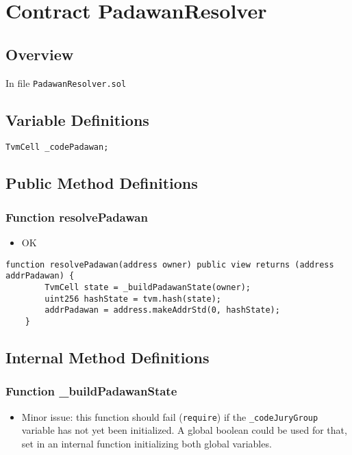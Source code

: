 
\chapter{Contract PadawanResolver}

\minitoc

\section{Overview}


In file {\tt PadawanResolver.sol}

\section{Variable Definitions}

\begin{lstlisting}[firstnumber=8]
    TvmCell _codePadawan;
\end{lstlisting}

\section{Public Method Definitions}

\subsection{Function resolvePadawan}

\begin{itemize}
\item OK
\end{itemize}

\begin{lstlisting}[firstnumber=10]
    function resolvePadawan(address owner) public view returns (address addrPadawan) {
        TvmCell state = _buildPadawanState(owner);
        uint256 hashState = tvm.hash(state);
        addrPadawan = address.makeAddrStd(0, hashState);
    }
\end{lstlisting}

\section{Internal Method Definitions}


\subsection{Function \_{}buildPadawanState}

\begin{itemize}
\item Minor issue: this function should fail ({\tt require}) if the
  {\tt \_codeJuryGroup} variable has not yet been initialized. A global
  boolean could be used for that, set in an internal function
  initializing both global variables.
\end{itemize}

